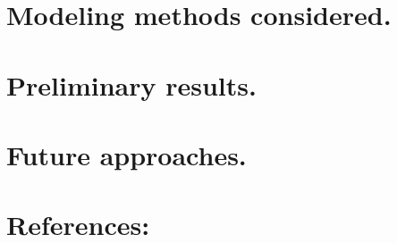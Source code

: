 \documentclass[10pt]{article}
\begin{document}
\section{Modeling methods considered.}

\section{Preliminary results.}

\section{Future approaches.}

\section{References:}
\end{document}
